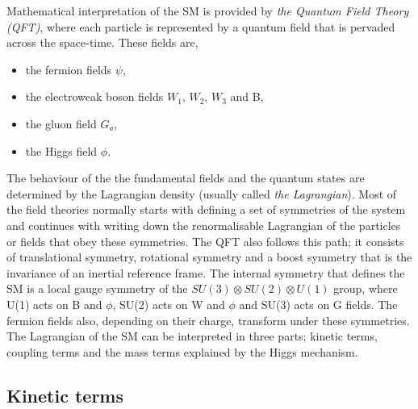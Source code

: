 Mathematical interpretation of the SM is provided by \emph{the Quantum Field Theory (QFT)}, where each particle is represented by a quantum field that is pervaded across the space-time. These fields are,
\begin{itemize}
  \item the fermion fields $\psi$,
  \item the electroweak boson fields $W_1$, $W_2$, $W_3$ and B,
  \item the gluon field $G_a$,
  \item the Higgs field $\phi$.
\end{itemize}

The behaviour of the the fundamental fields and the quantum states are determined by the Lagrangian density (usually called \emph{the Lagrangian}). Most of the field theories normally starts with defining a set of symmetries of the system and continues with writing down the renormalisable Lagrangian of the particles or fields that obey these symmetries. The QFT also follows this path; it consists of translational symmetry, rotational symmetry and a boost symmetry that is the invariance of an inertial reference frame. The internal symmetry that defines the SM is a local gauge symmetry of the $ SU(3) \otimes SU(2) \otimes U(1)$ group, where U(1) acts on B and $\phi$, SU(2) acts on W and $\phi$ and SU(3) acts on G fields. The fermion fields also, depending on their charge, transform under these symmetries. The Lagrangian of the SM can be interpreted in three parts; kinetic terms, coupling terms and the mass terms explained by the Higgs mechanism.

\subsection{Kinetic terms}

